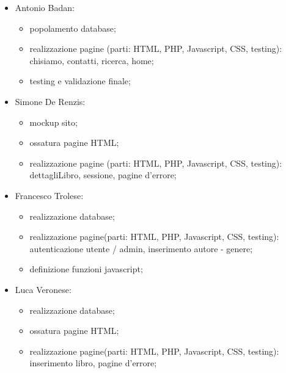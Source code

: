 \documentclass[12pt,a4paper,headings=optiontohead]{article}
\begin{document}
	\begin{itemize}
		\item Antonio Badan: 
		\begin{itemize}
			\item popolamento database;
			\item realizzazione pagine (parti: HTML, PHP, Javascript, CSS, testing): chisiamo, contatti, ricerca, home;
			\item testing e validazione finale;
		\end{itemize}
		
		\item Simone De Renzis: 
		\begin{itemize}
			\item mockup sito;
			\item ossatura pagine HTML;
			\item realizzazione pagine (parti: HTML, PHP, Javascript, CSS, testing): dettagliLibro, sessione, pagine d'errore;
		\end{itemize}
		
		\item Francesco Trolese:
		\begin{itemize}
			\item realizzazione database;
			\item realizzazione pagine(parti: HTML, PHP, Javascript, CSS, testing): autenticazione utente / admin, inserimento autore - genere;
			\item definizione funzioni javascript;
		\end{itemize}
		
		\item Luca Veronese: 
		\begin{itemize}
			\item realizzazione database;
			\item ossatura pagine HTML;
			\item realizzazione pagine(parti: HTML, PHP, Javascript, CSS, testing): inserimento libro, pagine d'errore;
		\end{itemize}
	\end{itemize}
	
\end{document}

